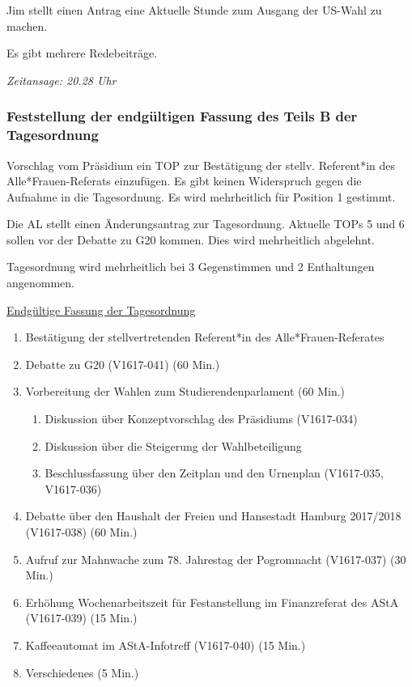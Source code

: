 \documentclass[ngerman,headheight=70pt]{scrartcl}
\begin{document}
    Jim stellt einen Antrag eine Aktuelle Stunde zum Ausgang der US-Wahl zu machen.

    Es gibt mehrere Redebeiträge.

    \textit{Zeitansage: 20.28 Uhr}

    \subsubsection{Feststellung der endgültigen Fassung des Teils B der Tagesordnung}

    Vorschlag vom Präsidium ein TOP zur Bestätigung der stellv. Referent*in des
    Alle*Frauen-Referats einzufügen.
    Es gibt keinen Widerspruch gegen die Aufnahme in die Tagesordnung.
    Es wird mehrheitlich für Position 1 gestimmt.

    Die AL stellt einen Änderungsantrag zur Tagesordnung. Aktuelle TOPs 5 und 6
    sollen vor der Debatte zu G20 kommen. Dies wird mehrheitlich abgelehnt.

    Tagesordnung wird mehrheitlich bei 3 Gegenstimmen und 2 Enthaltungen angenommen.

    \underline{Endgültige Fassung der Tagesordnung}
    \begin{enumerate}[label={\textbf{Top \theenumi}},leftmargin=*]
        \item Bestätigung der stellvertretenden Referent*in des Alle*Frauen-Referates
        \item Debatte zu G20 (V1617-041) (60 Min.)
        \item Vorbereitung der Wahlen zum Studierendenparlament (60 Min.)
        \begin{enumerate}
            \item Diskussion über Konzeptvorschlag des Präsidiums (V1617-034)
            \item Diskussion über die Steigerung der Wahlbeteiligung
            \item Beschlussfassung über den Zeitplan und den Urnenplan
            (V1617-035, V1617-036)
        \end{enumerate}
        \item Debatte über den Haushalt der Freien und Hansestadt Hamburg
              2017/2018 (V1617-038) (60 Min.)
        \item Aufruf zur Mahnwache zum 78. Jahrestag der Pogromnacht (V1617-037) (30 Min.)
        \item Erhöhung Wochenarbeitszeit für Festanstellung im Finanzreferat des AStA (V1617-039) (15 Min.)
        \item Kaffeeautomat im AStA-Infotreff (V1617-040) (15 Min.)
        \item Verschiedenes (5 Min.)
    \end{enumerate}
\end{document}
